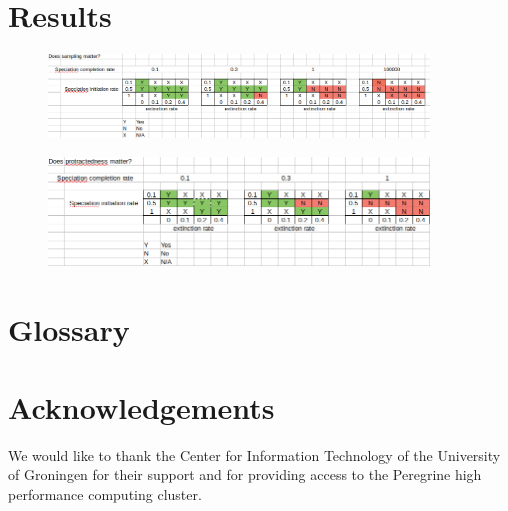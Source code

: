 \documentclass{article}
\begin{document}
\section{Results}

\begin{figure}[]
  \includegraphics[width=0.9\textwidth]{fig_does_sampling_matter.png}
\end{figure}

\begin{figure}[]
  \includegraphics[width=0.9\textwidth]{fig_does_protractedness_matter.png}
\end{figure}

\section{Glossary}


\section{Acknowledgements}

We would like to thank the Center for Information Technology of the University of Groningen for their support
and for providing access to the Peregrine high performance computing cluster.
\end{document}
